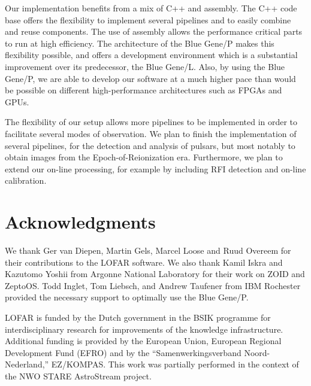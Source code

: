 \documentclass{sig-alternate}
\begin{document}

Our implementation benefits from a mix of C++ and assembly. The C++ code base offers the flexibility
to implement several pipelines and to easily combine and reuse components. The use of assembly allows
the performance critical parts to run at high efficiency. The architecture of the Blue Gene/P makes this
flexibility possible, and offers a development environment which is a substantial improvement over
its predecessor, the Blue Gene/L. Also, by using the Blue Gene/P, we are able to develop our software at a much higher pace than would be possible on different high-performance architectures such as FPGAs and GPUs.

The flexibility of our setup allows more pipelines to be implemented in order to facilitate several
modes of observation. We plan to finish the implementation of several pipelines, for the detection
and analysis of pulsars, but most notably to obtain images from the Epoch-of-Reionization era. Furthermore,
we plan to extend our on-line processing, for example by including RFI detection and on-line calibration.



\section*{Acknowledgments}

We thank Ger van Diepen, Martin Gels, Marcel Loose and Ruud Overeem
for their contributions to the LOFAR software.
We also thank Kamil Iskra and Kazutomo Yoshii from Argonne National Laboratory
for their work on ZOID and ZeptoOS.
Todd Inglet, Tom Liebsch, and Andrew Taufener from IBM Rochester provided the
necessary support to optimally use the Blue Gene/P.

LOFAR is funded by the Dutch government in the BSIK programme for
interdisciplinary research for improvements of the knowledge
infrastructure.  Additional funding is provided by the European Union,
European Regional Development Fund (EFRO) and by the
``Samenwerkingsverband Noord-Nederland,'' EZ/KOMPAS. This work was
partially performed in the context of the NWO STARE AstroStream
project.



\end{document}
